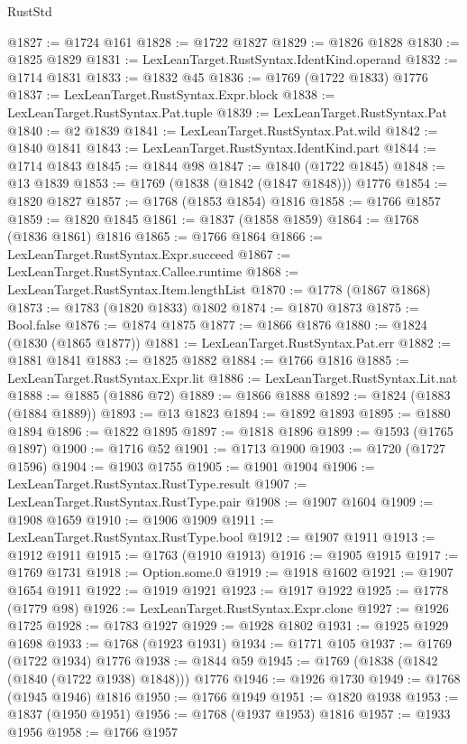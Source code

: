 \begin{lexlean}{RustStd}
\begin{coremodule}
@1827 := @1724 @161
@1828 := @1722 @1827
@1829 := @1826 @1828
@1830 := @1825 @1829
@1831 := LexLeanTarget.RustSyntax.IdentKind.operand
@1832 := @1714 @1831
@1833 := @1832 @45
@1836 := @1769 (@1722 @1833) @1776
@1837 := LexLeanTarget.RustSyntax.Expr.block
@1838 := LexLeanTarget.RustSyntax.Pat.tuple
@1839 := LexLeanTarget.RustSyntax.Pat
@1840 := @2 @1839
@1841 := LexLeanTarget.RustSyntax.Pat.wild
@1842 := @1840 @1841
@1843 := LexLeanTarget.RustSyntax.IdentKind.part
@1844 := @1714 @1843
@1845 := @1844 @98
@1847 := @1840 (@1722 @1845)
@1848 := @13 @1839
@1853 := @1769 (@1838 (@1842 (@1847 @1848))) @1776
@1854 := @1820 @1827
@1857 := @1768 (@1853 @1854) @1816
@1858 := @1766 @1857
@1859 := @1820 @1845
@1861 := @1837 (@1858 @1859)
@1864 := @1768 (@1836 @1861) @1816
@1865 := @1766 @1864
@1866 := LexLeanTarget.RustSyntax.Expr.succeed
@1867 := LexLeanTarget.RustSyntax.Callee.runtime
@1868 := LexLeanTarget.RustSyntax.Item.lengthList
@1870 := @1778 (@1867 @1868)
@1873 := @1783 (@1820 @1833) @1802
@1874 := @1870 @1873
@1875 := Bool.false
@1876 := @1874 @1875
@1877 := @1866 @1876
@1880 := @1824 (@1830 (@1865 @1877))
@1881 := LexLeanTarget.RustSyntax.Pat.err
@1882 := @1881 @1841
@1883 := @1825 @1882
@1884 := @1766 @1816
@1885 := LexLeanTarget.RustSyntax.Expr.lit
@1886 := LexLeanTarget.RustSyntax.Lit.nat
@1888 := @1885 (@1886 @72)
@1889 := @1866 @1888
@1892 := @1824 (@1883 (@1884 @1889))
@1893 := @13 @1823
@1894 := @1892 @1893
@1895 := @1880 @1894
@1896 := @1822 @1895
@1897 := @1818 @1896
@1899 := @1593 (@1765 @1897)
@1900 := @1716 @52
@1901 := @1713 @1900
@1903 := @1720 (@1727 @1596)
@1904 := @1903 @1755
@1905 := @1901 @1904
@1906 := LexLeanTarget.RustSyntax.RustType.result
@1907 := LexLeanTarget.RustSyntax.RustType.pair
@1908 := @1907 @1604
@1909 := @1908 @1659
@1910 := @1906 @1909
@1911 := LexLeanTarget.RustSyntax.RustType.bool
@1912 := @1907 @1911
@1913 := @1912 @1911
@1915 := @1763 (@1910 @1913)
@1916 := @1905 @1915
@1917 := @1769 @1731
@1918 := Option.some.{0}
@1919 := @1918 @1602
@1921 := @1907 @1654 @1911
@1922 := @1919 @1921
@1923 := @1917 @1922
@1925 := @1778 (@1779 @98)
@1926 := LexLeanTarget.RustSyntax.Expr.clone
@1927 := @1926 @1725
@1928 := @1783 @1927
@1929 := @1928 @1802
@1931 := @1925 @1929 @1698
@1933 := @1768 (@1923 @1931)
@1934 := @1771 @105
@1937 := @1769 (@1722 @1934) @1776
@1938 := @1844 @59
@1945 := @1769 (@1838 (@1842 (@1840 (@1722 @1938) @1848))) @1776
@1946 := @1926 @1730
@1949 := @1768 (@1945 @1946) @1816
@1950 := @1766 @1949
@1951 := @1820 @1938
@1953 := @1837 (@1950 @1951)
@1956 := @1768 (@1937 @1953) @1816
@1957 := @1933 @1956
@1958 := @1766 @1957

\end{coremodule}
\end{lexlean}
